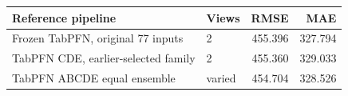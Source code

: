 \begin{tabular}{llrr}
\toprule
Reference pipeline & Views & RMSE & MAE \\
\midrule
Frozen TabPFN, original 77 inputs & 2 & 455.396 & 327.794 \\
TabPFN CDE, earlier-selected family & 2 & 455.360 & 329.033 \\
TabPFN ABCDE equal ensemble & varied & 454.704 & 328.526 \\
\bottomrule
\end{tabular}
